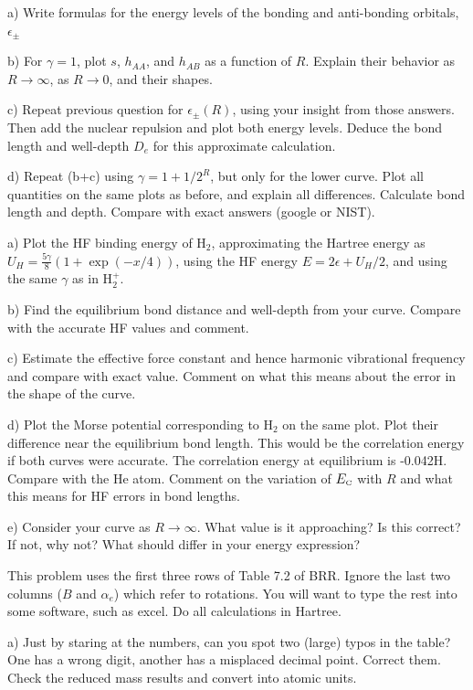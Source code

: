 a) Write formulas for the energy levels of the bonding and anti-bonding orbitals, $\epsilon_\pm$

b) For $\gamma=1$, plot $s$, $h_{AA}$, and $h_{AB}$ as a function of $R$.   Explain their
behavior as $R\to \infty$, as $R\to 0$, and their shapes.

c) Repeat previous question for $\epsilon_\pm(R)$, using your insight from those answers.
Then add the nuclear repulsion and plot both energy levels.  Deduce the bond length and well-depth
$D_e$ for this approximate calculation.   

d) Repeat (b+c) using $\gamma=1+1/2^R$, but only for the lower curve.  
Plot all quantities on the same plots as before, and explain all differences.
Calculate bond length and depth.
Compare with exact answers (google or NIST).

\newpage
{}

a) Plot the HF binding energy of H$_2$, approximating the Hartree energy as $U_H=\frac{5\gamma}{8} (1+\exp(-x/4))$,
using the HF energy $E=2\epsilon + U_H/2$, and using the same $\gamma$ as in H$_2^+$.

b) Find the equilibrium bond distance and well-depth from your curve.  Compare with the accurate HF values
and comment.

c) Estimate the effective force constant and hence harmonic vibrational frequency and compare with exact
value.  Comment on what this means about the error in the shape of the curve.

d) Plot the Morse potential corresponding to H$_2$ on the same plot.  Plot their difference near the 
equilibrium bond length.  This would be the correlation energy if both curves were accurate.  
The correlation energy at equilibrium is -0.042H.   Compare with the He atom.
Comment on the variation of $E_{\scriptscriptstyle\rm C}$ with $R$ and what this means for HF errors in bond lengths.

e) Consider your curve as $R\to\infty$.  What value is it approaching?  Is this correct?  If not,
why not?  What should differ in your energy expression?


\newpage
{}

This problem uses the first three rows of Table 7.2 of BRR.  Ignore the last two columns
($B$ and $\alpha_e$) which refer to rotations.  You will want to type the rest into 
some software, such as excel.  Do all calculations in Hartree.

a) Just by staring at the numbers, can you spot two (large) typos in the table?  One has
a wrong digit, another has a misplaced decimal point.  Correct them.
Check the reduced mass results and convert into atomic units.

